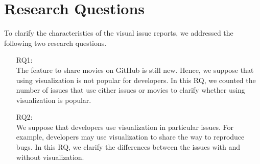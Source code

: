 \section{Research Questions}
\label{sec:rqs}

To clarify the characteristics of 
the visual issue reports,
we addressed the following 
two research questions. 
\begin{itemize}
	\item[RQ1:] \textbf{\RQone{}}\\
	The feature to share movies on GitHub 
	is still new. 
	Hence, we suppose that using visualization 
	is not popular for developers. 
	In this RQ, we counted the number of 
	issues that use either issues or movies 
	to clarify whether using visualization 
	is popular. 
	\item[RQ2:] \textbf{\RQtwo{}}\\
	We suppose that developers use visualization 
	in particular issues. 
	For example, developers may use visualization 
	to share the way to reproduce bugs. 
	In this RQ, we clarify the differences 
	between the issues with and without 
	visualization. 
\end{itemize}